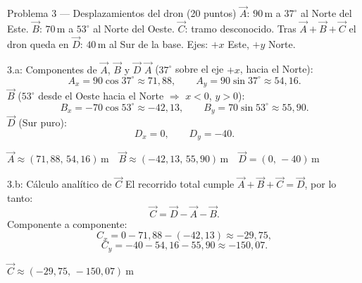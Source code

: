 \documentclass[letterpaper, 11pt]{article}
\begin{document}
\newpage
\begin{enunciadobox}{Problema 3 --- Desplazamientos del dron \hfill (20 puntos)}
$\vec{A}$: $90\,\mathrm{m}$ a $37^\circ$ al Norte del Este.\quad
$\vec{B}$: $70\,\mathrm{m}$ a $53^\circ$ al Norte del Oeste.\quad
$\vec{C}$: tramo desconocido.\quad
Tras $\vec{A}+\vec{B}+\vec{C}$ el dron queda en
$\vec{D}$: $40\,\mathrm{m}$ al Sur de la base. Ejes: $+x$ Este, $+y$ Norte.
\end{enunciadobox}

\begin{paso}{3.a: Componentes de $\vec{A}$, $\vec{B}$ y $\vec{D}$}
\textbf{$\vec{A}$} ($37^\circ$ sobre el eje $+x$, hacia el Norte):
\[
A_x=90\cos 37^\circ\approx 71{,}88,\qquad A_y=90\sin 37^\circ\approx 54{,}16 .
\]
\textbf{$\vec{B}$} ($53^\circ$ desde el Oeste hacia el Norte $\Rightarrow$ $x<0$, $y>0$):
\[
B_x=-70\cos 53^\circ\approx -42{,}13,\qquad B_y=70\sin 53^\circ\approx 55{,}90 .
\]
\textbf{$\vec{D}$} (Sur puro):
\[
D_x=0,\qquad D_y=-40 .
\]
\begin{resultado}\centering
$\vec{A}\approx(71{,}88,\,54{,}16)\,\mathrm{m}\quad
 \vec{B}\approx(-42{,}13,\,55{,}90)\,\mathrm{m}\quad
 \vec{D}=(0,\,-40)\,\mathrm{m}$
\end{resultado}
\end{paso}

\begin{paso}{3.b: C\'alculo anal\'itico de $\vec{C}$}
El recorrido total cumple $\vec{A}+\vec{B}+\vec{C}=\vec{D}$, por lo tanto:
\[
\vec{C}=\vec{D}-\vec{A}-\vec{B}.
\]
Componente a componente:
\[
C_x=0-71{,}88-(-42{,}13)\approx -29{,}75,
\]
\[
C_y=-40-54{,}16-55{,}90\approx -150{,}07 .
\]
\begin{resultado}\centering
$\displaystyle \vec{C}\approx(-29{,}75,\,-150{,}07)\ \mathrm{m}$
\end{resultado}
\end{paso}
\end{document}

